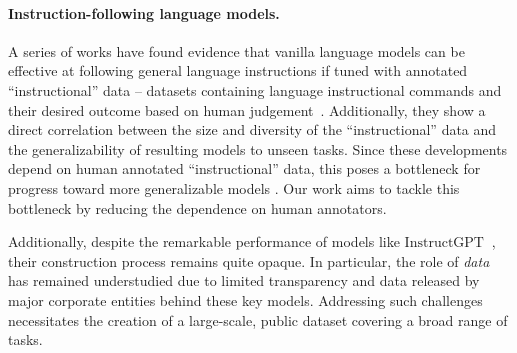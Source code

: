 \documentclass[11pt]{article}
\newcommand{\nascomment}[1]{\textcolor{blue}{\textbf{[#1 -- \textsc{nas}]}}}
\newcommand{\gptinstruct}[1]{$\text{InstructGPT}_{\text{#1}}$}
\begin{document}
\paragraph{Instruction-following language models.}
A series of works have found evidence that vanilla language models can be effective at following general language instructions if tuned with annotated ``instructional'' data -- datasets containing language instructional commands and their desired outcome based on human judgement~\cite{weller2020learning, mishra2022cross,wang2022benchmarking,wei2022finetuned,sanh2022multitask,ouyang2022training,parmar-etal-2022-boxbart, scialom2022continual, chung2022scaling,luo2022biotabqa,puri2022how,yin2022contintin,chakrabarty2022help,lin2022unsupervised,gupta2022improving,muennighoff2022crosslingual}. 
Additionally, they show a direct correlation between the size and diversity of the ``instructional'' data and the generalizability of resulting models to unseen tasks. 
Since these developments depend on human annotated ``instructional'' data, this poses a bottleneck for progress toward more generalizable models 
\cite[for example see Fig.~5a in][]{wang2022benchmarking}. 
Our work aims to tackle this bottleneck by reducing the dependence on human annotators. 

Additionally, despite the remarkable performance of models like  \gptinstruct{}~\cite{ouyang2022training}, their construction process remains quite opaque. 
In particular, the role of \emph{data} has remained understudied due to limited transparency and data released by major corporate entities behind these key models. 
Addressing such challenges necessitates the creation of a large-scale, public dataset covering a broad range of tasks.


    
\end{document}
